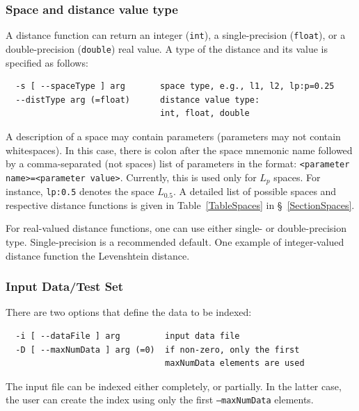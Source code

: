\documentclass[runningheads,a4paper]{llncs}
\newcommand{\ttt}[1]{\texttt{#1}}
\begin{document}
{\subsubsection{Space and distance value type}

A distance function can return an integer (\ttt{int}), a single-precision (\ttt{float}),
or a double-precision (\ttt{double}) real value.
A type of the distance and its value is specified as follows:

\begin{verbatim}
  -s [ --spaceType ] arg       space type, e.g., l1, l2, lp:p=0.25
  --distType arg (=float)      distance value type: 
                               int, float, double
\end{verbatim}

A description of a space may contain parameters (parameters may not contain whitespaces).
In this case, there is colon after the space mnemonic name followed by a
comma-separated (not spaces) list of parameters in the format:
\ttt{<parameter name>=<parameter value>}.
Currently, this is used only for $L_p$ spaces. For instance,
 \ttt{lp:0.5} denotes the space $L_{0.5}$.
A detailed list of possible spaces and respective
distance functions is given in Table~\ref{TableSpaces} in \S~\ref{SectionSpaces}.

For real-valued distance functions, one can use either single- or double-precision
type. Single-precision is a recommended default.
One example of integer-valued distance function the Levenshtein distance.

\subsubsection{Input Data/Test Set}
There are two options that define the data to be indexed:
\begin{verbatim}
  -i [ --dataFile ] arg         input data file
  -D [ --maxNumData ] arg (=0)  if non-zero, only the first 
                                maxNumData elements are used
\end{verbatim}
The input file can be indexed either completely, or partially.
In the latter case, the user can create the index using only
the first \ttt{--maxNumData} elements.

}
\end{document}
